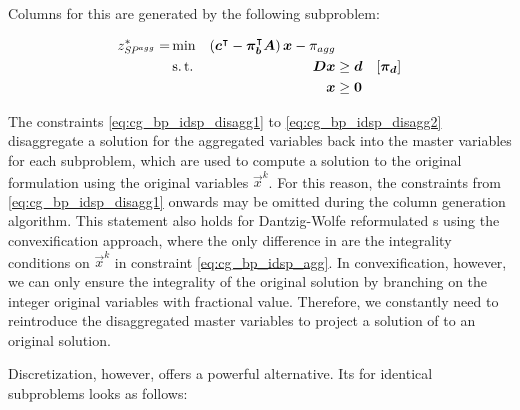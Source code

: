 Columns for this \MP{} are generated by the following subproblem:

\begin{equation}
\begin{aligned}
z^*_\SP{agg} = &\min & \left( \vec{c}\transpose - \vec{\pi}_\vec{b}\transpose \mat{A} \right) \vec{x} - \pi_{agg} & & \\
&\st & \mat{D} \vec{x} & \geq \vec{d} & \left[\vec{\pi}_\vec{d}\right] \\
&& \vec{x} & \geq \vec{0}
\end{aligned}
\end{equation}

The constraints \eqref{eq:cg_bp_idsp_disagg1} to \eqref{eq:cg_bp_idsp_disagg2} disaggregate a solution for the aggregated variables back into the master variables for each subproblem, which are used to compute a solution to the original formulation using the original variables $\vec{x}^k$. For this reason, the constraints from \eqref{eq:cg_bp_idsp_disagg1} onwards may be omitted during the column generation algorithm. This statement also holds for Dantzig-Wolfe reformulated \IP{}s using the convexification approach, where the only difference in \MP{} are the integrality conditions on $\vec{x}^k$ in constraint \eqref{eq:cg_bp_idsp_agg}. In convexification, however, we can only ensure the integrality of the original solution by branching on the integer original variables with fractional value. Therefore, we constantly need to reintroduce the disaggregated master variables to project a solution of \RMP{} to an original solution.

Discretization, however, offers a powerful alternative. Its \MP{} for identical subproblems looks as follows:

